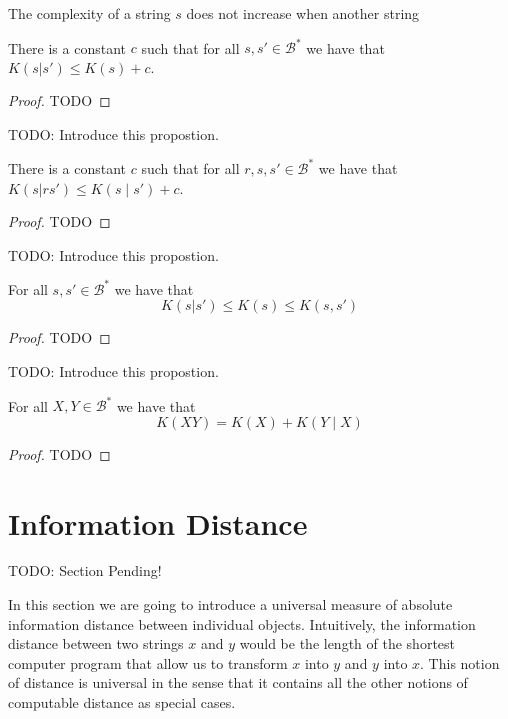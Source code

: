 The complexity of a string $s$ does not increase when another string

\begin{proposition}
\label{prop:kolmogorov_conditional}
There is a constant $c$ such that for all $s, s'\in\mathcal{B}^{\ast}$ we have that $K(s | s' ) \leq K(s) + c$.
\end{proposition}
\begin{proof}
{\color{red} TODO}
\end{proof}

{\color{red} TODO: Introduce this propostion.}

\begin{proposition}
\label{prop:kolmogorov_joint_conditional}
There is a constant $c$ such that for all $r ,s, s'\in\mathcal{B}^{\ast}$ we have that $K(s | rs' ) \leq K(s \mid s') + c$.
\end{proposition}
\begin{proof}
{\color{red} TODO}
\end{proof}


{\color{red} TODO: Introduce this propostion.}

\begin{proposition}
\label{prop:kolmogorov_relations}
For all $s, s'\in\mathcal{B}^{\ast}$ we have that
\[
K(s | s' ) \leq K(s) \leq K(s, s')
\]
\end{proposition}
\begin{proof}
{\color{red} TODO}
\end{proof}

{\color{red} TODO: Introduce this propostion.}

\begin{proposition}
\label{prop:kolmogorov_relations}
For all $X, Y\in\mathcal{B}^{\ast}$ we have that
\[
K(XY) = K(X) + K(Y \mid X)
\]
\end{proposition}
\begin{proof}
{\color{red} TODO}
\end{proof}




%
%

\section{Information Distance}
\label{sec:information_distance}

{\color{red} TODO: Section Pending!}

In this section we are going to introduce a universal measure of absolute information distance between individual objects. Intuitively, the information distance between two strings $x$ and $y$ would be the length of the shortest computer program that allow us to transform $x$ into $y$ and $y$ into $x$. This notion of distance is universal in the sense that it contains all the other notions of computable distance as special cases.

